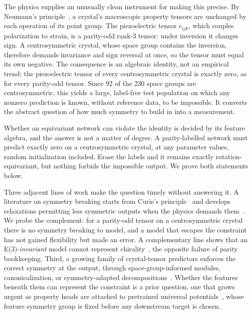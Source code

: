The physics supplies an unusually clean instrument for making this precise. By Neumann's principle~\cite{nye1985crystals}, a crystal's macroscopic property tensors are unchanged by each operation of its point group. The piezoelectric tensor $e_{ijk}$, which couples polarization to strain, is a parity-odd rank-3 tensor: under inversion it changes sign. A centrosymmetric crystal, whose space group contains the inversion, therefore demands invariance and sign reversal at once, so the tensor must equal its own negative. The consequence is an algebraic identity, not an empirical trend: the piezoelectric tensor of every centrosymmetric crystal is exactly zero, as for every parity-odd tensor. Since 92 of the 230 space groups are centrosymmetric, this yields a large, label-free test population on which any nonzero prediction is known, without reference data, to be impossible. It converts the abstract question of how much symmetry to build in into a measurement.

Whether an equivariant network can violate the identity is decided by its feature algebra, and the answer is not a matter of degree. A parity-labelled network must predict exactly zero on a centrosymmetric crystal, at any parameter values, random initialization included. Erase the labels and it remains exactly rotation-equivariant, but nothing forbids the impossible output. We prove both statements below.

Three adjacent lines of work make the question timely without answering it. A literature on symmetry breaking starts from Curie's principle~\cite{curie1894symmetry} and develops relaxations permitting less symmetric outputs when the physics demands them~\cite{smidt2021symmetry,kaba2023symmetry}. We probe the complement: for a parity-odd tensor on a centrosymmetric crystal there is no symmetry breaking to model, and a model that escapes the constraint has not gained flexibility but made an error. A complementary line shows that an E(3)-\emph{invariant} model cannot represent chirality~\cite{dumitrescu2024chirality}, the opposite failure of parity bookkeeping. Third, a growing family of crystal-tensor predictors enforces the correct symmetry at the output, through space-group-informed modules, canonicalization, or symmetry-adapted decompositions~\cite{piezotensornet2024}. Whether the features beneath them can represent the constraint is a prior question, one that grows urgent as property heads are attached to pretrained universal potentials~\cite{hung2024dielectric}, whose feature symmetry group is fixed before any downstream target is chosen.

